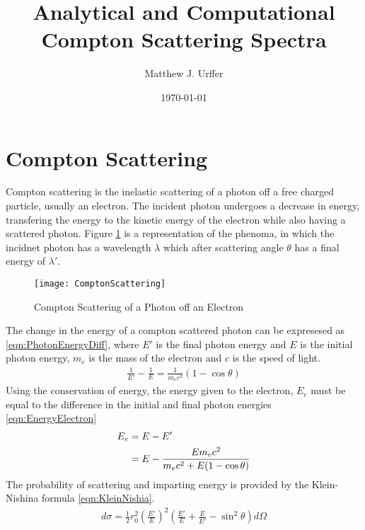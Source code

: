 \documentclass[draftcls,onecolumn]{IEEEtran}
\begin{document}
\title{Analytical and Computational Compton Scattering Spectra}
\author{Matthew J. Urffer}
\date{\today}
\maketitle

\printnomenclature

\listoftodos
\tableofcontents
\listoffigures
\listoftables
\lstlistoflistings

\section{Compton Scattering}
Compton scattering is the inelastic scattering of a photon off a free charged particle, usually an electron.
The incident photon undergoes a decrease in energy, transfering the energy to the kinetic energy of the electron while also having a scattered photon.
Figure \ref{fig:ComptonScattering} is a representation of the phenoma, in which the incidnet photon has a wavelength $\lambda$ which after scattering angle $\theta$ has a final energy of $\lambda'$.
\begin{figure}
  \centering
  \texttt{[image: ComptonScattering]}
  \caption{Compton Scattering of a Photon off an Electron}
  \label{fig:ComptonScattering}
\end{figure}
The change in the energy of a compton scattered photon can be expresesed as \eqref{eqn:PhotonEnergyDiff}, where $E'$ is the final photon energy and $E$ is the initial photon energy, $m_e$ is the mass of the electron and $c$ is the speed of light.
\begin{align}
  \label{eqn:FinalPhotonEnergy}
  \frac{1}{E'} -\frac{1}{E} = \frac{1}{m_e c^2}\left(1-\cos\theta\right) 
\end{align}
Using the conservation of energy, the energy given to the electron, $E_e$ must be equal to the difference in the initial and final photon energies \eqref{eqn:EnergyElectron}
\begin{align}
  \label{eqn:EnergyElectron}
  E_e &= E - E' \\ \notag
   &= E - \frac{E m_e c^2}{m_e c^2 + E (1-\cos\theta)}
\end{align}
The probability of scattering and imparting energy is provided by the Klein-Nishina formula \eqref{eqn:KleinNishia}.
\begin{align}
  \label{eqn:KleinNishina}
  d\sigma = \frac{1}{2} r_0^2 \left(\frac{E'}{E}\right)^2 \left(\frac{E'}{E} + \frac{E}{E'}-\sin^2\theta\right)d\Omega
\end{align}
\end{document}
